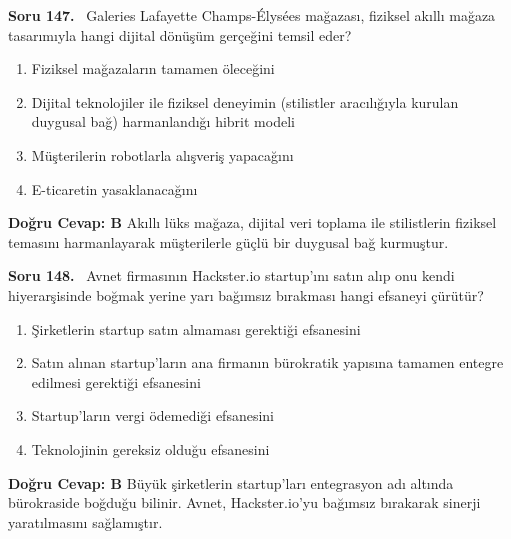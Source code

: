 \documentclass[11pt,a4paper,openany]{book}
\begin{document}
\needspace{5cm}
\vspace{8pt}
\noindent\textbf{\large\sffamily Soru 147.} \ Galeries Lafayette Champs-Élysées mağazası, fiziksel akıllı mağaza tasarımıyla hangi dijital dönüşüm gerçeğini temsil eder?
\begin{enumerate}[label=\Alph*), leftmargin=25pt, topsep=4pt, itemsep=2pt]
    \item Fiziksel mağazaların tamamen öleceğini
    \item Dijital teknolojiler ile fiziksel deneyimin (stilistler aracılığıyla kurulan duygusal bağ) harmanlandığı hibrit modeli
    \item Müşterilerin robotlarla alışveriş yapacağını
    \item E-ticaretin yasaklanacağını
\end{enumerate}
\vspace{4pt}
\begin{tcolorbox}[title=Cevap ve Açıklama, colback=gray!3!white, colframe=primarycolor!90!black, arc=2mm, fonttitle=\bfseries\sffamily, top=6pt, bottom=6pt]
    \textbf{Doğru Cevap: B}
    \vspace{2pt}
    Akıllı lüks mağaza, dijital veri toplama ile stilistlerin fiziksel temasını harmanlayarak müşterilerle güçlü bir duygusal bağ kurmuştur.
\end{tcolorbox}
\vspace{10pt}

\needspace{5cm}
\vspace{8pt}
\noindent\textbf{\large\sffamily Soru 148.} \ Avnet firmasının Hackster.io startup'ını satın alıp onu kendi hiyerarşisinde boğmak yerine yarı bağımsız bırakması hangi efsaneyi çürütür?
\begin{enumerate}[label=\Alph*), leftmargin=25pt, topsep=4pt, itemsep=2pt]
    \item Şirketlerin startup satın almaması gerektiği efsanesini
    \item Satın alınan startup'ların ana firmanın bürokratik yapısına tamamen entegre edilmesi gerektiği efsanesini
    \item Startup'ların vergi ödemediği efsanesini
    \item Teknolojinin gereksiz olduğu efsanesini
\end{enumerate}
\vspace{4pt}
\begin{tcolorbox}[title=Cevap ve Açıklama, colback=gray!3!white, colframe=primarycolor!90!black, arc=2mm, fonttitle=\bfseries\sffamily, top=6pt, bottom=6pt]
    \textbf{Doğru Cevap: B}
    \vspace{2pt}
    Büyük şirketlerin startup'ları entegrasyon adı altında bürokraside boğduğu bilinir. Avnet, Hackster.io'yu bağımsız bırakarak sinerji yaratılmasını sağlamıştır.
\end{tcolorbox}
\vspace{10pt}
\end{document}
